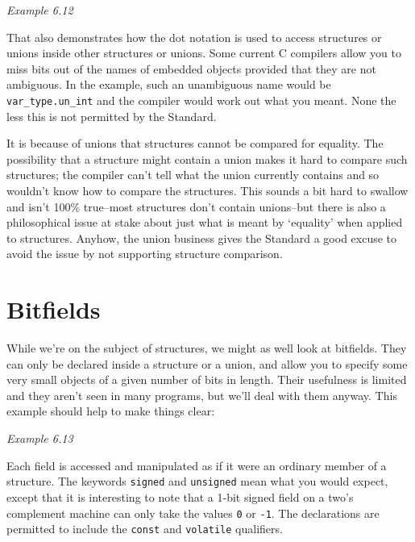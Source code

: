   \begin{center}\textit{Example 6.12}\end{center}


  That also demonstrates how the dot notation is used to access structures
   or unions inside other structures or unions. Some current C compilers allow
   you to miss bits out of the names of embedded objects provided that they are
   not ambiguous. In the example, such an unambiguous name would be
   \texttt{var\_type.un\_int} and the compiler would work out what you meant.
   None the less this is not permitted by the Standard.


  It is because of unions that structures cannot be compared for equality.
   The possibility that a structure might contain a union makes it hard to
   compare such structures; the compiler can't tell what the union currently
   contains and so wouldn't know how to compare the structures. This sounds
   a bit hard to swallow and isn't 100\% true--most structures don't contain
   unions--but there is also a philosophical issue at stake about just what
   is meant by `equality' when applied to structures. Anyhow, the union
   business gives the Standard a good excuse to avoid the issue by not
   supporting structure comparison.


 
        \section{Bitfields}
        

  

  While we're on the subject of structures, we might as well look at
   bitfields. They can only be declared inside a structure or a union, and
   allow you to specify some very small objects of a given number of bits in
   length.  Their usefulness is limited and they aren't seen in many programs,
   but we'll deal with them anyway. This example should help to make things
   clear:


  \begin{center}\textit{Example 6.13}\end{center}


  Each field is accessed and manipulated as if it were an ordinary member of
   a structure. The keywords \texttt{signed} and \texttt{unsigned} mean
   what you would expect, except that it is interesting to note that a 1-bit
   signed field on a two's complement machine can only take the values
   \texttt{0} or \texttt{-1}. The declarations are permitted to include
   the \texttt{const} and \texttt{volatile} qualifiers.


